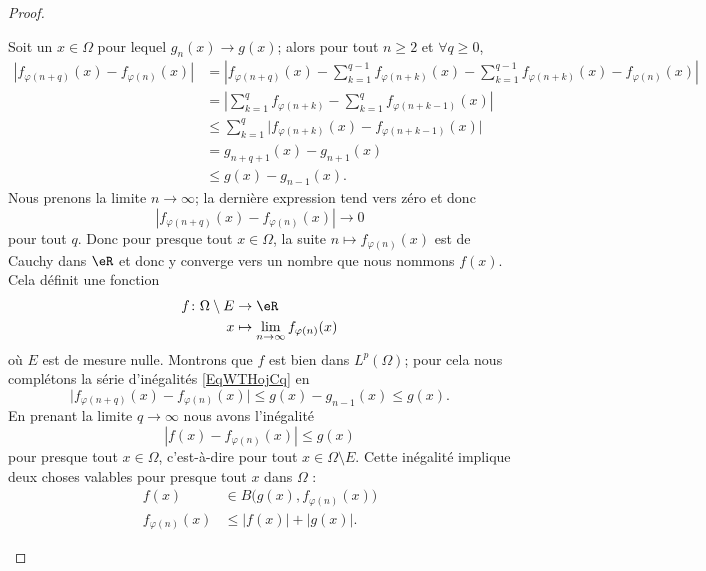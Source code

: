 \begin{proof}
\begin{subproof}
        Soit un \( x\in \Omega\) pour lequel \( g_n(x)\to g(x)\); alors pour tout \( n\geq 2\) et \( \forall q\geq 0\),
        \begin{subequations}    \label{EqWTHojCq}
            \begin{align}
                | f_{\varphi(n+q)}(x)-f_{\varphi(n)}(x) |&=\left| f_{\varphi(n+q)}(x)-\sum_{k=1}^{q-1}f_{\varphi(n+k)}(x) -\sum_{k=1}^{q-1}f_{\varphi(n+k)}(x)-f_{\varphi(n)}(x) \right| \\
                &=\left| \sum_{k=1}^qf_{\varphi(n+k)}-\sum_{k=1}^qf_{\varphi(n+k-1)}(x) \right|\\
                &\leq \sum_{k=1}^q\Big| f_{\varphi(n+k)}(x)-f_{\varphi(n+k-1)}(x) \Big|\\
                &=g_{n+q+1}(x)-g_{n+1}(x)\\
                &\leq g(x)-g_{n-1}(x).
            \end{align}
        \end{subequations}
        Nous prenons la limite \( n\to \infty\); la dernière expression tend vers zéro et donc
        \begin{equation}
            | f_{\varphi(n+q)}(x)-f_{\varphi(n)}(x) |\to 0
        \end{equation}
        pour tout \( q\). Donc pour presque tout \( x\in \Omega\), la suite \( n\mapsto f_{\varphi(n)}(x)\) est de Cauchy dans \( \eR\) et donc y converge vers un nombre que nous nommons \( f(x)\). Cela définit une fonction
        \begin{equation}
            \begin{aligned}
                f\colon \Omega\setminus E&\to \eR \\
                x&\mapsto \lim_{n\to \infty} f_{\varphi(n)}(x)
            \end{aligned}
        \end{equation}
        où \( E\) est de mesure nulle. Montrons que \( f\) est bien dans \( L^p(\Omega)\); pour cela nous complétons la série d'inégalités \eqref{EqWTHojCq} en
        \begin{equation}
            \big| f_{\varphi(n+q)}(x)-f_{\varphi(n)}(x) \big|\leq g(x)-g_{n-1}(x)\leq g(x).
        \end{equation}
        En prenant la limite \( q\to \infty\) nous avons l'inégalité
        \begin{equation}    \label{EqMQbDRac}
            | f(x)-f_{\varphi(n)}(x) |\leq g(x)
        \end{equation}
        pour presque tout \( x\in\Omega\), c'est-à-dire pour tout \( x\in\Omega\setminus E\). Cette inégalité implique deux choses valables pour presque tout \( x\) dans \( \Omega\) :
        \begin{subequations}
            \begin{align}
                f(x)&\in B\big( g(x),f_{\varphi(n)}(x) \big)\\
                f_{\varphi(n)}(x)&\leq | f(x) |+| g(x) |.
            \end{align}
        \end{subequations}


\end{subproof}
\end{proof}
